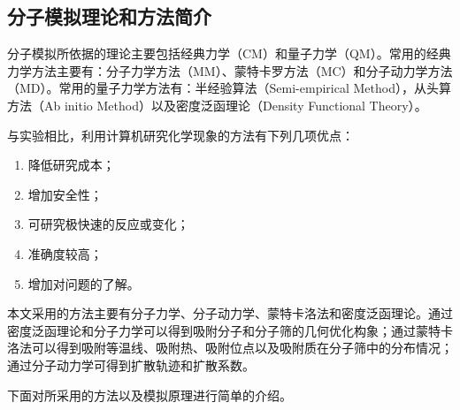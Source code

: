 \subsection{分子模拟理论和方法简介}
\par{分子模拟所依据的理论主要包括经典力学（CM）和量子力学（QM）。常用的经典力学方法主要有：分子力学方法（MM）、蒙特卡罗方法（MC）和分子动力学方法（MD）。常用的量子力学方法有：半经验算法（Semi-empirical Method），从头算方法（Ab initio Method）以及密度泛函理论（Density Functional Theory）\cite{刘丹2004分子模拟在分子筛催化研究中的应用}。}
\par{与实验相比，利用计算机研究化学现象的方法有下列几项优点\cite{分子模拟的理论与实践}：}
\begin{enumerate}
    \item 降低研究成本；
    \item 增加安全性；
    \item 可研究极快速的反应或变化；
    \item 准确度较高；
    \item 增加对问题的了解。
\end{enumerate}
\par{本文采用的方法主要有分子力学、分子动力学、蒙特卡洛法和密度泛函理论。通过密度泛函理论和分子力学可以得到吸附分子和分子筛的几何优化构象；通过蒙特卡洛法可以得到吸附等温线、吸附热、吸附位点以及吸附质在分子筛中的分布情况；通过分子动力学可得到扩散轨迹和扩散系数。}
\par{下面对所采用的方法以及模拟原理进行简单的介绍。}
